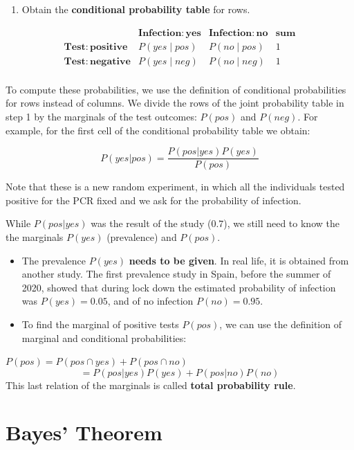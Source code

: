 \documentclass[
]{book}
\providecommand{\tightlist}{%
  \setlength{\itemsep}{0pt}\setlength{\parskip}{0pt}}
\begin{document}
\begin{enumerate}
\def\labelenumi{\arabic{enumi}.}
\setcounter{enumi}{1}
\tightlist
\item
  Obtain the \textbf{conditional probability table} for rows.
\end{enumerate}

\[
\begin{array}{cccc}
    & \mathbf{Infection: yes} & \mathbf{Infection: no} & \mathbf{sum} \\ 
    \mathbf{Test: positive} & P(yes \mid pos) & P(no \mid pos ) & 1 \\ \hline
    \mathbf{Test: negative} & P(yes \mid neg) & P(no \mid neg) & 1\\ 
\end{array}
\]

To compute these probabilities, we use the definition of conditional probabilities for rows instead of columns. We divide the rows of the joint probability table in step 1 by the marginals of the test outcomes: \(P(pos)\) and \(P(neg)\). For example, for the first cell of the conditional probability table we obtain:

\[P(yes| pos)= \frac{P(pos|yes)P(yes)}{P(pos)}\]

Note that these is a new random experiment, in which all the individuals tested positive for the PCR fixed and we ask for the probability of infection.

While \(P(pos|yes)\) was the result of the study (\(0.7\)), we still need to know the the marginals \(P(yes)\) (prevalence) and \(P(pos)\).

\begin{itemize}
\item
  The prevalence \(P(yes)\) \textbf{needs to be given}. In real life, it is obtained from another study. The first prevalence study in Spain, before the summer of 2020, showed that during lock down the estimated probability of infection was \(P(yes)=0.05\), and of no infection \(P(no)=0.95\).
\item
  To find the marginal of positive tests \(P(pos)\), we can use the definition of marginal and conditional probabilities:
\end{itemize}

\(P(pos)= P(pos \cap yes) + P(pos \cap no)\)
\[= P(pos| yes)P (yes)+P(pos|no)P(no)\]
This last relation of the marginals is called \textbf{total probability rule}.

\hypertarget{bayes-theorem}{%
\section{Bayes' Theorem}\label{bayes-theorem}}
\end{document}
